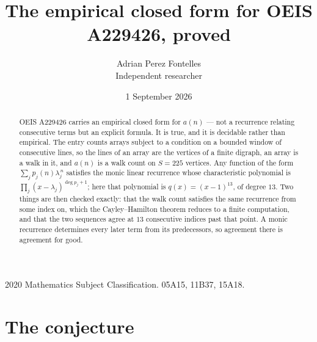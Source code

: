 \documentclass[11pt,a4paper]{article}
\title{The empirical closed form for OEIS A229426, proved}
\author{Adrian Perez Fontelles\\ \small Independent researcher}
\date{1 September 2026}
\theoremstyle{plain}
\theoremstyle{definition}
\begin{document}
\maketitle

\begin{abstract}
OEIS A229426 carries an empirical closed form for $a(n)$ --- not a recurrence relating
consecutive terms but an explicit formula. It is true, and it is decidable rather than
empirical. The entry counts arrays subject to a condition on a bounded window of consecutive lines, so the lines of an array are the
vertices of a finite digraph, an array is a walk in it, and $a(n)$ is a walk count on
$S=225$ vertices. Any function of the form $\sum_j p_j(n)\lambda_j^{\,n}$ satisfies the
monic linear recurrence whose characteristic polynomial is
$\prod_j(x-\lambda_j)^{\deg p_j+1}$; here that polynomial is $q(x)=(x-1)^{13}$, of degree
$13$. Two things are then checked exactly: that the walk count satisfies the same
recurrence from some index on, which the Cayley--Hamilton theorem reduces to a finite
computation, and that the two sequences agree at $13$ consecutive indices past that
point. A monic recurrence determines every later term from its predecessors, so agreement
there is agreement for good.
\end{abstract}

\noindent\small 2020 Mathematics Subject Classification. 05A15, 11B37, 15A18.\normalsize

\section{The conjecture}
\end{document}
